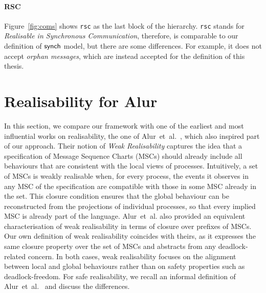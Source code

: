 
\paragraph{RSC}
Figure~\ref{fig:coms} shows \verb|rsc| as the last block of the hierarchy.
\verb|rsc| stands for \emph{Realisable in Synchronous Communication}, therefore, 
is comparable to our definition of $\mathsf{synch}$ model, but there are 
some differences. For example, it does not accept \emph{orphan messages}, 
which are instead accepted for the definition of this thesis.


\section{Realisability for Alur}
In this section, we compare our framework with one of the earliest and
most influential works on realisability, the one of 
Alur~et~al.~\cite{alur2005realizability}, which also inspired part of our
approach. Their notion of \emph{Weak Realisability} captures the idea that
a specification of Message Sequence Charts (MSCs) should already include
all behaviours that are consistent with the local views of processes. 
Intuitively, a set of MSCs is weakly realisable when, for every process,
the events it observes in any MSC of the specification are compatible
with those in some MSC already in the set. This closure condition ensures
that the global behaviour can be reconstructed from the projections of
individual processes, so that every implied MSC is already part of the
language. Alur~et~al. also provided an equivalent characterisation of
weak realisability in terms of closure over prefixes of MSCs. Our own definition
of weak realisability coincides with theirs, as it expresses the same
closure property over the set of MSCs and abstracts from any
deadlock-related concern. In both cases, weak realisability focuses on
the alignment between local and global behaviours rather than on safety
properties such as deadlock-freedom. For safe realisability, we recall an
informal definition of Alur~et~al.~\cite{alur2005realizability} and discuss
the differences.

